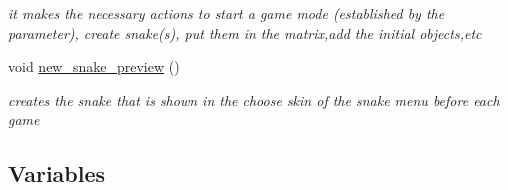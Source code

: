\begin{DoxyCompactItemize}
\begin{DoxyCompactList}\small\item\em it makes the necessary actions to start a game mode (established by the parameter), create snake(s), put them in the matrix,add the initial objects,etc \end{DoxyCompactList}\item 
void \hyperlink{group__man__events_gacc914291496b74fddbe876393dda69a6}{new\+\_\+snake\+\_\+preview} ()
\begin{DoxyCompactList}\small\item\em creates the snake that is shown in the choose skin of the snake menu before each game \end{DoxyCompactList}\end{DoxyCompactItemize}
\subsection*{Variables}
